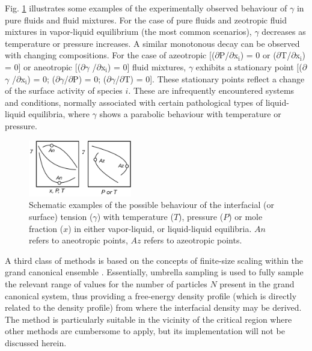 \documentclass[9pt,tutorial]{livecoms}
\begin{document}
Fig. \ref{fig:3} illustrates some examples of the experimentally observed behaviour of
$\gamma$ in pure fluids and fluid mixtures. For the case of pure fluids and
zeotropic fluid mixtures in vapor-liquid equilibrium (the most common
scenarios), {${\gamma}$} decreases as temperature or pressure increases.
A similar monotonous decay can be observed with changing compositions. For the
case of azeotropic [(${\partial}$P/${\partial}$x$_{\mathrm{i}}$) = 0 or
(${\partial}$T/${\partial}$x$_{\mathrm{i}}$) = 0] or aneotropic
[(${\partial}${${\gamma}$} /${\partial}$x$_{\mathrm{i}}$) = 0] fluid mixtures,
{${\gamma}$} exhibits a stationary point [(${\partial}${${\gamma}$}
/${\partial}$x$_{\mathrm{i}}$) = 0; (${\partial}${${\gamma}$}/${\partial}$P)
= 0; (${\partial}${${\gamma}$}/${\partial}$T) = 0]. These stationary points
reflect a change of the surface activity of species $i$. These are
infrequently encountered systems and conditions, normally associated with
certain pathological types of liquid-liquid equilibria, where {${\gamma}$} shows a parabolic
behaviour with temperature or pressure.
\begin{figure}
  \centering
  \includegraphics[width=0.4\textwidth]{gfx/image7.png}
  \caption{Schematic examples of the possible behaviour of the interfacial (or surface) tension ({${\gamma}$}) with temperature ($T$), pressure ($P$) or mole fraction ($x$) in either vapor-liquid, or liquid-liquid equilibria. $An$ refers to aneotropic points, $Az$ refers to azeotropic points.}
  \label{fig:3}
\end{figure}

A third class of methods is based on the
concepts of finite-size scaling within the grand canonical ensemble 
\citep{binder1982,errington2003}. Essentially, umbrella
sampling is used to fully sample the relevant range of values for the number of
particles $N$ present in the grand canonical system, thus providing a free-energy
density profile (which is directly related to the density profile) from where
the interfacial density may be derived. The method is particularly suitable in the vicinity of
the critical region where other methods are cumbersome to apply, but its
implementation \cite{allen2017,schrader2009} will not be discussed
herein.
\end{document}
